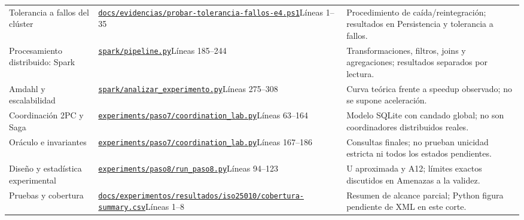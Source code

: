 {\begin{longtable}{>{\raggedright\arraybackslash}p{2.5cm}>{\raggedright\arraybackslash}p{6.7cm}>{\raggedright\arraybackslash}p{5.2cm}}
Tolerancia a fallos del clúster & \href{https://github.com/JoseLozanoMorales/TiendaTech/blob/d7a00ccf6d8ac5def08ff52f7d2880f869667b0b/docs/evidencias/probar-tolerancia-fallos-e4.ps1\#L1-L35}{\nolinkurl{docs/evidencias/probar-tolerancia-fallos-e4.ps1}}\newline Líneas 1--35 & Procedimiento de caída/reintegración; resultados en Persistencia y tolerancia a fallos.\\
Procesamiento distribuido: Spark & \href{https://github.com/JoseLozanoMorales/TiendaTech/blob/d7a00ccf6d8ac5def08ff52f7d2880f869667b0b/spark/pipeline.py\#L185-L244}{\nolinkurl{spark/pipeline.py}}\newline Líneas 185--244 & Transformaciones, filtros, joins y agregaciones; resultados separados por lectura.\\
Amdahl y escalabilidad & \href{https://github.com/JoseLozanoMorales/TiendaTech/blob/d7a00ccf6d8ac5def08ff52f7d2880f869667b0b/spark/analizar_experimento.py\#L275-L308}{\nolinkurl{spark/analizar_experimento.py}}\newline Líneas 275--308 & Curva teórica frente a speedup observado; no se supone aceleración.\\
Coordinación 2PC y Saga & \href{https://github.com/JoseLozanoMorales/TiendaTech/blob/d7a00ccf6d8ac5def08ff52f7d2880f869667b0b/experiments/paso7/coordination_lab.py\#L63-L164}{\nolinkurl{experiments/paso7/coordination_lab.py}}\newline Líneas 63--164 & Modelo SQLite con candado global; no son coordinadores distribuidos reales.\\
Oráculo e invariantes & \href{https://github.com/JoseLozanoMorales/TiendaTech/blob/d7a00ccf6d8ac5def08ff52f7d2880f869667b0b/experiments/paso7/coordination_lab.py\#L167-L186}{\nolinkurl{experiments/paso7/coordination_lab.py}}\newline Líneas 167--186 & Consultas finales; no prueban unicidad estricta ni todos los estados pendientes.\\
Diseño y estadística experimental & \href{https://github.com/JoseLozanoMorales/TiendaTech/blob/d7a00ccf6d8ac5def08ff52f7d2880f869667b0b/experiments/paso8/run_paso8.py\#L94-L123}{\nolinkurl{experiments/paso8/run_paso8.py}}\newline Líneas 94--123 & U aproximada y A12; límites exactos discutidos en Amenazas a la validez.\\
Pruebas y cobertura & \href{https://github.com/JoseLozanoMorales/TiendaTech/blob/d7a00ccf6d8ac5def08ff52f7d2880f869667b0b/docs/experimentos/resultados/iso25010/cobertura-summary.csv\#L1-L8}{\nolinkurl{docs/experimentos/resultados/iso25010/cobertura-summary.csv}}\newline Líneas 1--8 & Resumen de alcance parcial; Python figura pendiente de XML en este corte.\\

\end{longtable}}
